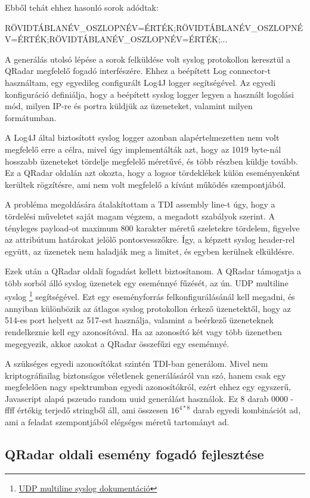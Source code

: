 Ebből tehát ehhez hasonló sorok adódtak:

RÖVIDTÁBLANÉV\_OSZLOPNÉV=ÉRTÉK;RÖVIDTÁBLANÉV\_OSZLOPNÉV=ÉRTÉK;RÖVIDTÁBLANÉV\_OSZLOPNÉV=ÉRTÉK;...


A generálás utolsó lépése a sorok felküldése volt syslog protokollon keresztül a QRadar megfelelő fogadó interfészére. Ehhez a beépített Log connector-t használtam, egy egyedileg configurált Log4J logger segítségével. Az egyedi konfiguráció definiálja, hogy a beépített syslog logger legyen a használt logolási mód, milyen IP-re és portra küldjük az üzeneteket, valamint milyen formátumban.

A Log4J által biztosított syslog logger azonban alapértelmezetten nem volt megfelelő erre a célra, mivel úgy implementálták azt, hogy az 1019 byte-nál hosszabb üzeneteket tördelje megfelelő méretűvé, és több részben küldje tovább. Ez a QRadar oldalán azt okozta, hogy a logsor tördeklékek külön eseményenként kerültek rögzítésre, ami nem volt megfelelő a kívánt működés szempontjából.

A probléma megoldására átalakítottam a TDI assembly line-t úgy, hogy a tördelési műveletet saját magam végzem, a megadott szabályok szerint. A tényleges payload-ot maximum 800 karakter méretű szeletekre tördelem, figyelve az attribútum határokat jelölő pontosvesszőkre. Így, a képzett syslog header-rel együtt, az üzenetek nem haladják meg a limitet, és egyben kerülnek elküldésre. 

Ezek után a QRadar oldali fogadást kellett biztosítanom. A QRadar támogatja a több sorból álló syslog üzenetek egy eseménnyé fűzését, az ún. UDP multiline syslog \footnote{ \href{https://www.ibm.com/support/knowledgecenter/SS42VS_7.2.2/com.ibm.qradar.doc_7.2.2/t_logsource_UDPmultiprotocol.html}{UDP multiline syslog dokumentáció}} 
segítségével. Ezt egy eseményforrás felkonfigurálásánál kell megadni, és annyiban különbözik az átlagos syslog protokollon érkező üzenetektől, hogy az 514-es port helyett az 517-est használja, valamint a beérkező üzeneteknek rendelkeznie kell egy azonosítóval. Ha az azonosító két vagy több üzenetben megegyezik, akkor azokat a QRadar összefűzi egy eseménnyé.

A szükséges egyedi azonosítókat szintén TDI-ban generálom. Mivel nem kriptográfiailag biztonságos véletlenek generálásáról van szó, hanem csak egy megfelelően nagy spektrumban egyedi azonosítókról, ezért ehhez egy egyszerű, Javascript alapú pszeudo random uuid generálást használok. Ez 8 darab 0000 - ffff értékig terjedő stringből áll, ami összesen $16^{4 * 8} $ darab egyedi kombinációt ad, ami a feladat szempontjából elégséges méretű tartományt ad.


\subsection{QRadar oldali esemény fogadó fejlesztése}